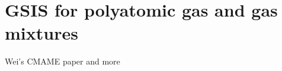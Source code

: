 \chapter{GSIS for polyatomic gas and gas mixtures}
\label{chap:GSIS_poly}


Wei's CMAME paper and more


\newpage

